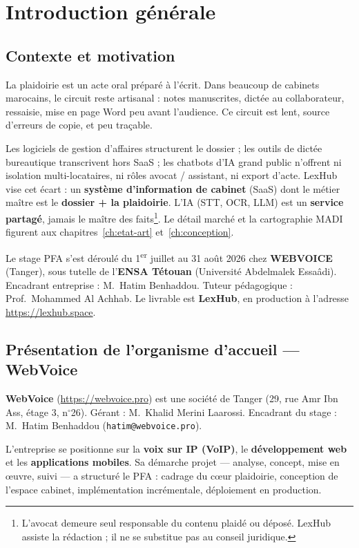 \chapter{Introduction générale}
\label{ch:intro}

\section{Contexte et motivation}

La plaidoirie est un acte oral préparé à l'écrit. Dans beaucoup de cabinets marocains, le circuit reste artisanal : notes manuscrites, dictée au collaborateur, ressaisie, mise en page Word peu avant l'audience. Ce circuit est lent, source d'erreurs de copie, et peu traçable.

Les logiciels de gestion d'affaires structurent le dossier ; les outils de dictée bureautique transcrivent hors SaaS ; les chatbots d'IA grand public n'offrent ni isolation multi-locataires, ni rôles avocat / assistant, ni export d'acte. LexHub vise cet écart : un \textbf{système d'information de cabinet} (SaaS) dont le métier maître est le \textbf{dossier + la plaidoirie}. L'IA (STT, OCR, LLM) est un \textbf{service partagé}, jamais le maître des faits\footnote{L'avocat demeure seul responsable du contenu plaidé ou déposé. LexHub assiste la rédaction ; il ne se substitue pas au conseil juridique.}. Le détail marché et la cartographie MADI figurent aux chapitres~\ref{ch:etat-art} et~\ref{ch:conception}.

Le stage PFA s'est déroulé du 1\textsuperscript{er} juillet au 31 août 2026 chez \textbf{WEBVOICE} (Tanger), sous tutelle de l'\textbf{ENSA Tétouan} (Université Abdelmalek Essaâdi). Encadrant entreprise : M.~Hatim Benhaddou. Tuteur pédagogique : Prof.~Mohammed Al Achhab. Le livrable est \textbf{LexHub}, en production à l'adresse \url{https://lexhub.space}.

\section{Présentation de l'organisme d'accueil --- WebVoice}
\label{sec:webvoice}

\textbf{WebVoice} (\url{https://webvoice.pro}) est une société de Tanger (29, rue Amr Ibn Ass, étage 3, n$^\circ$26). Gérant : M.~Khalid Merini Laarossi. Encadrant du stage : M.~Hatim Benhaddou (\texttt{hatim@webvoice.pro}).

L'entreprise se positionne sur la \textbf{voix sur IP (VoIP)}, le \textbf{développement web} et les \textbf{applications mobiles}. Sa démarche projet --- analyse, concept, mise en œuvre, suivi --- a structuré le PFA : cadrage du cœur plaidoirie, conception de l'espace cabinet, implémentation incrémentale, déploiement en production.

